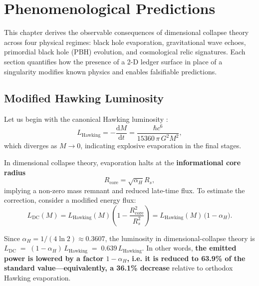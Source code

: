 \documentclass[a4paper, 12pt, oneside]{book}
\numberwithin{equation}{chapter}
\begin{document}


\chapter[Phenomenological Predictions]{Phenomenological Predictions}
\label{chap:Phenomenology}

\noindent
This chapter derives the observable consequences of dimensional collapse
theory across four physical regimes: black hole evaporation, gravitational
wave echoes, primordial black hole (PBH) evolution, and cosmological relic
signatures. Each section quantifies how the presence of a 2-D ledger surface
in place of a singularity modifies known physics and enables falsifiable
predictions.

\section{Modified Hawking Luminosity}
\label{sec:ModifiedHawking}

Let us begin with the canonical Hawking luminosity \cite{Page1999, Hawking1975}: 
\[
    L_{\text{Hawking}} = -\frac{\mathrm d M}{\mathrm dt}
    = \frac{\hbar c^6}{15360\,\pi\,G^2 M^2},
\]
which diverges as \( M \to 0 \), indicating explosive evaporation in the
final stages.

In dimensional collapse theory, evaporation halts at the
\textbf{informational core radius}
\[
    R_{\text{core}} = \sqrt{\alpha_H} R_s,
\]
implying a non-zero mass remnant and reduced late-time flux.
To estimate the correction, consider a modified energy flux:
\[
    L_{\text{DC}}(M) = L_{\text{Hawking}}(M)
        \left(1 - \frac{R_{\text{core}}^2}{R_s^2}\right)
        = L_{\text{Hawking}}(M)\,\bigl(1 - \alpha_H\bigr).
\]

Since $\alpha_H = 1/(4\ln 2) \approx 0.3607$, the luminosity in dimensional-collapse theory is
$ L_{\text{DC}} \;=\; (1-\alpha_H)\,L_{\text{Hawking}}\;=\; 0.639\,L_{\text{Hawking}}. $
In other words, \textbf{the emitted power is lowered by a factor $1-\alpha_H$, i.e. it is reduced to 63.9\% of the standard value—equivalently, a 36.1\% decrease} relative to orthodox Hawking evaporation.
\end{document}
